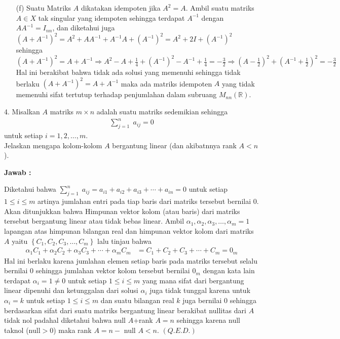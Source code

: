 \documentclass[11pt,a4paper]{article}
\newcommand{\ds}{\displaystyle}
\theoremstyle{plain}
\theoremstyle{definition}
\theoremstyle{remark}
\begin{document}
\begin{enumerate}
\begin{enumerate}
\begin{enumerate}
			\item[(f)] Suatu Matriks $A$ dikatakan idempoten jika $A^{2}=A$. Ambil suatu matriks $A\in X$ tak singular yang idempoten sehingga terdapat $A^{-1}$ dengan $AA^{-1}=I_{nn}$, dan diketahui juga $(A+A^{-1})^{2}=A^{2}+AA^{-1}+A^{-1}A+(A^{-1})^{2}=A^{2}+2I+(A^{-1})^{2}$ sehingga $\ds (A+A^{-1})^{2}=A+A^{-1}\Rightarrow A^{2}-A+\frac{1}{4}+(A^{-1})^{2}-A^{-1}+\frac{1}{4} =-\frac{3}{2} \Rightarrow \left(A-\frac{1}{2}\right)^{2}+\left(A^{-1}+\frac{1}{2}\right)^{2}=-\frac{3}{2}$ Hal ini berakibat bahwa tidak ada solusi yang memenuhi sehingga tidak berlaku $(A+A^{-1})^{2}=A+A^{-1}$ maka ada matriks idempoten $A$ yang tidak memenuhi sifat tertutup terhadap penjumlahan dalam subruang $M_{nn}(\mathbb{R})$.
		\end{enumerate}
	
	
		
		\textbf{Jawab :}
		
		Diketahui bahwa $\displaystyle \sum_{j=1}^{n}\; a_{ij}=a_{i1}+a_{i2}+a_{i3}+\cdots+a_{in}=0$ untuk setiap $1\le i \le m$ artinya jumlahan entri pada tiap baris dari matriks tersebut bernilai 0. Akan ditunjukkan bahwa Himpunan vektor kolom (atau baris) dari matriks tersebut bergantung linear atau tidak bebas linear. Ambil $\alpha_{1},\alpha_{2},\alpha_{3},\ldots,\alpha_{m}=1$ lapangan atas himpunan bilangan real dan himpunan vektor kolom dari matriks $A$ yaitu $\left\{ C_{1},C_{2},C_{3},\ldots,C_{m}\right\}$ lalu tinjau bahwa
		\begin{align*}
		\alpha_{1}C_{1}+\alpha_{2}C_{2}+\alpha_{3}C_{3}+\cdots+\alpha_{m}C_{m} &= C_{1}+C_{2}+C_{3}+\cdots+C_{m} = 0_{m}
		\end{align*}
		Hal ini berlaku karena jumlahan elemen setiap baris pada matriks tersebut selalu bernilai $0$ sehingga jumlahan vektor kolom tersebut bernilai $0_{m}$ dengan kata lain terdapat $\alpha_{i}=1\ne 0$ untuk setiap $1\le i\le m$ yang mana sifat dari bergantung linear dipenuhi dan ketunggalan dari solusi $\alpha_{i}$ juga tidak tunggal karena untuk $\alpha_{i}=k$ untuk setiap $1\le i\le m$ dan suatu bilangan real $k$ juga bernilai $0$ sehingga berdasarkan sifat dari suatu matriks bergantung linear berakibat nullitas dari $A$ tidak nol padahal diketahui bahwa null $A$+rank $A=n$ sehingga karena null taknol (null$>0$) maka rank $A=n -$  null $A < n $. $(Q.E.D.)$ 
		

\end{enumerate}
\end{enumerate}
\end{document}
